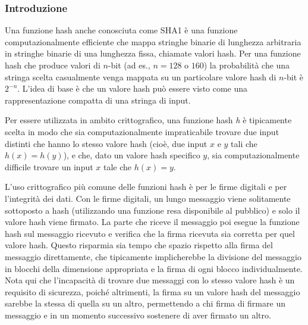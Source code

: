 \documentclass{article}
\theoremstyle{definition}
\begin{document}

\subsubsection{Introduzione} %
Una funzione hash anche conosciuta come \emph{} {SHA1} è una funzione computazionalmente efficiente che mappa stringhe binarie di lunghezza arbitraria in stringhe binarie di una lunghezza fissa, chiamate valori hash. Per una funzione hash che produce valori di \(n\)-bit (ad es., \(n = 128\) o \(160\)) la probabilità che una stringa scelta casualmente venga mappata su un particolare valore hash di \(n\)-bit è \(2^{-n}\). L'idea di base è che un valore hash può essere visto come una rappresentazione compatta di una stringa di input.

Per essere utilizzata in ambito crittografico, una funzione hash \textit{h} è tipicamente scelta in modo che sia computazionalmente impraticabile trovare due input distinti che hanno lo stesso valore hash (cioè, due input \(x\) e \(y\) tali che \(h(x) = h(y)\)), e che, dato un valore hash specifico \(y\), sia computazionalmente difficile trovare un input \(x\) tale che \(h(x) = y\).

L'uso crittografico più comune delle funzioni hash è per le firme digitali e per l'integrità dei dati. Con le firme digitali, un lungo messaggio viene solitamente sottoposto a hash (utilizzando una funzione resa disponibile al pubblico) e solo il valore hash viene firmato. La parte che riceve il messaggio poi esegue la funzione hash sul messaggio ricevuto e verifica che la firma ricevuta sia corretta per quel valore hash. Questo risparmia sia tempo che spazio rispetto alla firma del messaggio direttamente, che tipicamente implicherebbe la divisione del messaggio in blocchi della dimensione appropriata e la firma di ogni blocco individualmente. Nota qui che l'incapacità di trovare due messaggi con lo stesso valore hash è un requisito di sicurezza, poiché altrimenti, la firma su un valore hash del messaggio sarebbe la stessa di quella su un altro, permettendo a chi firma di firmare un messaggio e in un momento successivo sostenere di aver firmato un altro.
\end{document}
